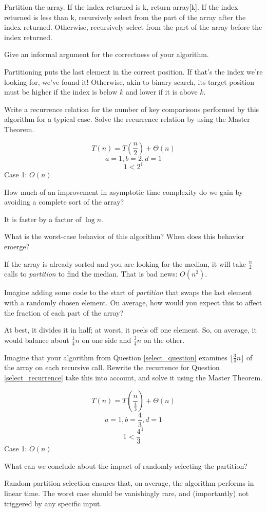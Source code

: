\documentclass{tufte-handout}
\begin{document}
\begin{questions}
{\color{red} 
Partition the array. 
If the index returned is k, return array[k].
If the index returned is less than k, recursively select from the part of the array after the index returned. Otherwise, recursively select from the part of the array before the index returned.
}


\item Give an informal argument for the correctness of your algorithm.

{\color{red} 
Partitioning puts the last element in the correct position. If that's the index we're looking for, we've found it! Otherwise, akin to binary search, its target position must be higher if the index is below $k$ and lower if it is above $k$.
}

\item Write a recurrence relation for the number of key comparisons performed by this algorithm for a typical case. Solve the recurrence relation by using the Master Theorem.

{\color{red} 
\[ T(n) = T(\frac{n}{2}) + \Theta(n) \]
\[a = 1, b = 2, d = 1\] 
\[1 < 2^1\]
Case 1: $O(n)$
}

\item How much of an improvement in asymptotic time complexity do we gain by avoiding a complete sort of the array?

{\color{red} 
It is faster by a factor of $\log n$.
}

\item What is the worst-case behavior of this algorithm? When does this behavior emerge? 

{\color{red} 
If the array is already sorted and you are looking for the median, it will take $\frac{n}{2}$ calls to \emph{partition} to find the median. That is bad news: $O(n^2)$.
}

\item Imagine adding some code to the start of \emph{partition} that swaps the last element with a randomly chosen element. On average, how would you expect this to affect the fraction of each part of the array?

{\color{red} At best, it divides it in half; at worst, it peels off one element. So, on average, it would balance about $\frac{1}{4}n$ on one side and $\frac{3}{4}n$ on the other.}

\item Imagine that your algorithm from Question \ref{select_question} examines $\lfloor \frac{3}{4} n \rfloor$ of the array on each recursive call. Rewrite the recurrence for Question \ref{select_recurrence} take this into account, and solve it using the Master Theorem.

{\color{red} 
\[ T(n) = T(\frac{n}{\frac{4}{3}}) + \Theta(n) \]
\[a = 1, b = \frac{4}{3}, d = 1\] 
\[1 < \frac{4}{3}^1\]
Case 1: $O(n)$
}

\item What can we conclude about the impact of randomly selecting the partition?

{\color{red} Random partition selection ensures that, on average, the algorithm performs in linear time. The worst case should be vanishingly rare, and (importantly) not triggered by any specific input.}

\end{questions}
\end{document}
